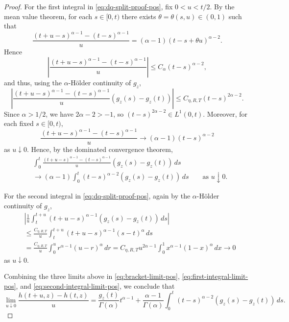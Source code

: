 \documentclass[letterpaper]{article}
\numberwithin{equation}{section}
\theoremstyle{definition}
\theoremstyle{remark}
\begin{document}
\begin{proof}
For the first integral in \eqref{eq:dq-split-proof-pos}, fix $0<u<t/2$. By the mean value theorem,
for each $s\in[0,t)$ there exists $\theta=\theta(s,u)\in(0,1)$ such that
\[
  \frac{(t+u-s)^{\alpha-1}-(t-s)^{\alpha-1}}{u}
  =
  (\alpha-1)(t-s+\theta u)^{\alpha-2}.
\]
Hence
\[
  \left|
    \frac{(t+u-s)^{\alpha-1}-(t-s)^{\alpha-1}}{u}
  \right|
  \le C_\alpha (t-s)^{\alpha-2},
\]
and thus, using the $\alpha$-H\"older continuity of $g_z$,
\[
  \left|
    \frac{(t+u-s)^{\alpha-1}-(t-s)^{\alpha-1}}{u}
    \left(g_z(s)-g_z(t)\right)
  \right|
  \le C_{\eta,R,T}(t-s)^{2\alpha-2}.
\]
Since $\alpha>1/2$, we have $2\alpha-2>-1$, so $(t-s)^{2\alpha-2}\in L^1(0,t)$.
Moreover, for each fixed $s\in[0,t)$,
\[
  \frac{(t+u-s)^{\alpha-1}-(t-s)^{\alpha-1}}{u}
  \to
  (\alpha-1)(t-s)^{\alpha-2}
\]
as $u\downarrow0$. Hence, by the dominated convergence theorem,
\begin{align}
  &\int_0^t
  \frac{(t+u-s)^{\alpha-1}-(t-s)^{\alpha-1}}{u}
  \left(g_z(s)-g_z(t)\right)\,ds
  \nonumber\\
  &\to
  (\alpha-1)\int_0^t (t-s)^{\alpha-2}\left(g_z(s)-g_z(t)\right)\,ds
  \qquad\text{as }u\downarrow0.
  \label{eq:first-integral-limit-pos}
\end{align}

For the second integral in \eqref{eq:dq-split-proof-pos}, again by the $\alpha$-H\"older continuity of $g_z$,
\begin{align}
  &\left|
    \frac{1}{u}\int_t^{t+u}(t+u-s)^{\alpha-1}
    \left(g_z(s)-g_z(t)\right)\,ds
  \right|
  \nonumber\\
  &\le
  \frac{C_{\eta,R,T}}{u}\int_t^{t+u}(t+u-s)^{\alpha-1}(s-t)^\alpha\,ds
  \nonumber\\
 &=
  \frac{C_{\eta,R,T}}{u}\int_0^u r^{\alpha-1}(u-r)^\alpha\,dr
 =
  C_{\eta,R,T}u^{2\alpha-1}\int_0^1 x^{\alpha-1}(1-x)^\alpha\,dx
  \to0
\label{eq:second-integral-limit-pos}
\end{align}
as $u\downarrow0$.

Combining the three limits above in \eqref{eq:bracket-limit-pos}, \eqref{eq:first-integral-limit-pos}, and \eqref{eq:second-integral-limit-pos},
we conclude that
\begin{equation}
  \lim_{u\downarrow0}\frac{h(t+u,z)-h(t,z)}{u}
  =
  \frac{g_z(t)}{\Gamma(\alpha)}t^{\alpha-1}
  +
  \frac{\alpha-1}{\Gamma(\alpha)}
  \int_0^t (t-s)^{\alpha-2}\left(g_z(s)-g_z(t)\right)\,ds .
  \label{eq:right-derivative-proof}
\end{equation}


\end{proof}
\end{document}
